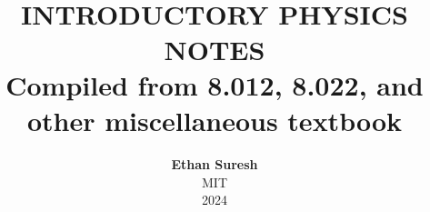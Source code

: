 \documentclass[openany,oneside]{book}
\begin{document}

\title{ \normalsize \textsc{}
		\\ [2.0cm]
		\HRule{1.5pt} \\
		\LARGE \textbf{\uppercase{ Introductory Physics Notes}
		\HRule{2.0pt} \\ [0.6cm] \LARGE{Compiled from 8.012, 8.022, and other miscellaneous textbook} \vspace*{10\baselineskip}}
		}
\date{}
\author{\textbf{Ethan Suresh} \\ 
		MIT \\
		2024}

\maketitle
\newpage

\tableofcontents
\newpage








\end{document}
